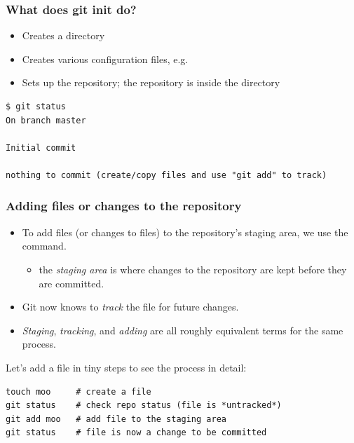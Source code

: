 \documentclass{git_course}
\begin{document}
\begin{frame}[fragile]
\frametitle{What does git init do?}
\begin{itemize}
    \item Creates a  directory
    \item Creates various configuration files, e.g. 
    \item Sets up the repository; the repository is inside the 
        directory
\end{itemize}
\end{frame}

\begin{frame}[fragile]
\begin{lstlisting}[basicstyle=\tiny\ttfamily]
$ git status
On branch master

Initial commit

nothing to commit (create/copy files and use "git add" to track)
\end{lstlisting}
\end{frame}


\begin{frame}[fragile]
\frametitle{Adding files or changes to the repository}
\begin{itemize}
    \item To add files (or changes to files) to the repository's
        staging area, we use the  command.
    \begin{itemize}
        \item the \emph{staging area} is where changes to the repository
            are kept before they are committed.
    \end{itemize}
    \item Git now knows to \emph{track} the file for future changes.
    \item \emph{Staging}, \emph{tracking}, and \emph{adding} are all
        roughly equivalent terms for the same process.
\end{itemize}

Let's add a file in tiny steps to see the process in detail:
\begin{lstlisting}
touch moo     # create a file
git status    # check repo status (file is *untracked*)
git add moo   # add file to the staging area
git status    # file is now a change to be committed
\end{lstlisting}
\end{frame}
\end{document}
